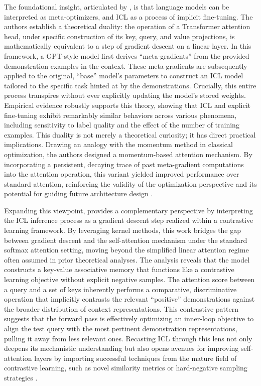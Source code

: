 \documentclass[11pt]{article}
\begin{document}
The foundational insight, articulated by \cite{ref12}, is that language models can be interpreted as meta-optimizers, and ICL as a process of implicit fine-tuning. The authors establish a theoretical duality: the operation of a Transformer attention head, under specific construction of its key, query, and value projections, is mathematically equivalent to a step of gradient descent on a linear layer. In this framework, a GPT-style model first derives ``meta-gradients'' from the provided demonstration examples in the context. These meta-gradients are subsequently applied to the original, ``base'' model's parameters to construct an ICL model tailored to the specific task hinted at by the demonstrations. Crucially, this entire process transpires without ever explicitly updating the model's stored weights. Empirical evidence robustly supports this theory, showing that ICL and explicit fine-tuning exhibit remarkably similar behaviors across various phenomena, including sensitivity to label quality and the effect of the number of training examples. This duality is not merely a theoretical curiosity; it has direct practical implications. Drawing an analogy with the momentum method in classical optimization, the authors designed a momentum-based attention mechanism. By incorporating a persistent, decaying trace of past meta-gradient computations into the attention operation, this variant yielded improved performance over standard attention, reinforcing the validity of the optimization perspective and its potential for guiding future architecture design \cite{ref12}.

Expanding this viewpoint, \cite{ref13} provides a complementary perspective by interpreting the ICL inference process as a gradient descent step realized within a contrastive learning framework. By leveraging kernel methods, this work bridges the gap between gradient descent and the self-attention mechanism under the standard softmax attention setting, moving beyond the simplified linear attention regime often assumed in prior theoretical analyses. The analysis reveals that the model constructs a key-value associative memory that functions like a contrastive learning objective without explicit negative samples. The attention score between a query and a set of keys inherently performs a comparative, discriminative operation that implicitly contrasts the relevant ``positive'' demonstrations against the broader distribution of context representations. This contrastive pattern suggests that the forward pass is effectively optimizing an inner-loop objective to align the test query with the most pertinent demonstration representations, pulling it away from less relevant ones. Recasting ICL through this lens not only deepens its mechanistic understanding but also opens avenues for improving self-attention layers by importing successful techniques from the mature field of contrastive learning, such as novel similarity metrics or hard-negative sampling strategies \cite{ref13}.
\end{document}
